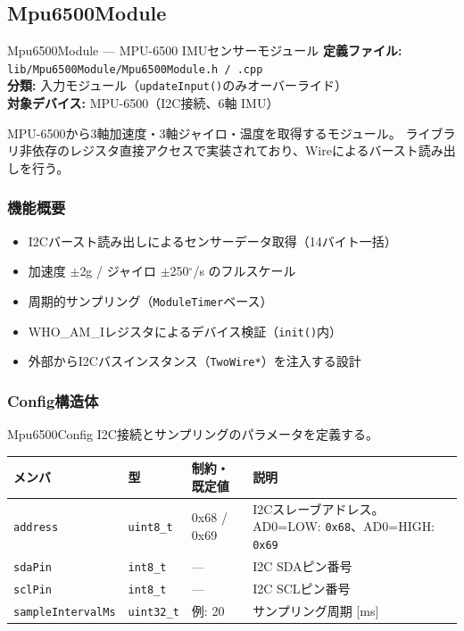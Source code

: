 \subsection{Mpu6500Module}

\begin{apibox}{Mpu6500Module --- MPU-6500 IMUセンサーモジュール}
\textbf{定義ファイル:} \texttt{lib/Mpu6500Module/Mpu6500Module.h / .cpp}\\
\textbf{分類:} 入力モジュール（\texttt{updateInput()}のみオーバーライド）\\
\textbf{対象デバイス:} MPU-6500（I2C接続、6軸 IMU）

MPU-6500から3軸加速度・3軸ジャイロ・温度を取得するモジュール。
ライブラリ非依存のレジスタ直接アクセスで実装されており、Wireによるバースト読み出しを行う。
\end{apibox}

\subsubsection{機能概要}

\begin{itemize}
    \item I2Cバースト読み出しによるセンサーデータ取得（14バイト一括）
    \item 加速度 $\pm$2g / ジャイロ $\pm$250$^{\circ}$/s のフルスケール
    \item 周期的サンプリング（\texttt{ModuleTimer}ベース）
    \item WHO\_AM\_Iレジスタによるデバイス検証（\texttt{init()}内）
    \item 外部からI2Cバスインスタンス（\texttt{TwoWire*}）を注入する設計
\end{itemize}

\subsubsection{Config構造体}

\begin{funcblock}{Mpu6500Config}
I2C接続とサンプリングのパラメータを定義する。

\begin{longtable}{l l l p{4.5cm}}
\toprule
\textbf{メンバ} & \textbf{型} & \textbf{制約・既定値} & \textbf{説明} \\
\midrule
\endhead
\texttt{address}          & \texttt{uint8\_t}  & 0x68 / 0x69    & I2Cスレーブアドレス。AD0=LOW: \texttt{0x68}、AD0=HIGH: \texttt{0x69} \\
\texttt{sdaPin}           & \texttt{int8\_t}   & ---            & I2C SDAピン番号 \\
\texttt{sclPin}           & \texttt{int8\_t}   & ---            & I2C SCLピン番号 \\
\texttt{sampleIntervalMs} & \texttt{uint32\_t} & 例: 20         & サンプリング周期 [ms] \\
\bottomrule
\end{longtable}
\end{funcblock}


